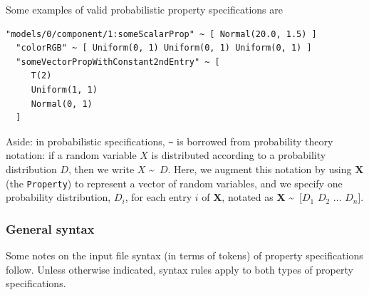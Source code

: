 \documentclass{article}
\begin{document}
Some examples of valid probabilistic property specifications are

\begin{lstlisting}[]
  "models/0/component/1:someScalarProp" ~ [ Normal(20.0, 1.5) ]
  "colorRGB" ~ [ Uniform(0, 1) Uniform(0, 1) Uniform(0, 1) ]
  "someVectorPropWithConstant2ndEntry" ~ [
     T(2)
     Uniform(1, 1)
     Normal(0, 1)
  ]
\end{lstlisting}

\begin{sideblock}
Aside: in probabilistic specifications, {\tt \textasciitilde} is borrowed from probability theory notation: if a random variable $X$ is distributed according to a probability distribution $D$, then we write $X$ \textasciitilde\ $D$. Here, we augment this notation by using $\textbf{X}$ (the {\tt Property}) to represent a vector of random variables, and we specify one probability distribution, $D_i$, for each entry $i$ of $\textbf{X}$, notated as $\textbf{X}$ \textasciitilde\ [$D_1$ $D_2$ ... $D_n$].
\end{sideblock}

\subsubsection{General syntax}

Some notes on the input file syntax (in terms of tokens) of property specifications follow. Unless otherwise indicated, syntax rules apply to both types of property specifications.
\end{document}
